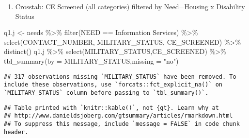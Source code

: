 \documentclass[
]{article}
\newenvironment{Shaded}{\begin{snugshade}}{\end{snugshade}}
\newcommand{\AttributeTok}[1]{\textcolor[rgb]{0.77,0.63,0.00}{#1}}
\newcommand{\FunctionTok}[1]{\textcolor[rgb]{0.00,0.00,0.00}{#1}}
\newcommand{\NormalTok}[1]{#1}
\newcommand{\OtherTok}[1]{\textcolor[rgb]{0.56,0.35,0.01}{#1}}
\newcommand{\SpecialCharTok}[1]{\textcolor[rgb]{0.00,0.00,0.00}{#1}}
\newcommand{\StringTok}[1]{\textcolor[rgb]{0.31,0.60,0.02}{#1}}
\providecommand{\tightlist}{%
  \setlength{\itemsep}{0pt}\setlength{\parskip}{0pt}}
\begin{document}
\begin{enumerate}
\def\labelenumi{\alph{enumi}.}
\setcounter{enumi}{9}
\tightlist
\item
  Crosstab: CE Screened (all categories) filtered by Need=Housing x
  Disability Status
\end{enumerate}

\begin{Shaded}
\begin{Highlighting}[]
\NormalTok{q1.j }\OtherTok{\textless{}{-}}\NormalTok{ needs }\SpecialCharTok{\%\textgreater{}\%} \FunctionTok{filter}\NormalTok{(NEED }\SpecialCharTok{==} \StringTok{\textquotesingle{}Information Services\textquotesingle{}}\NormalTok{) }\SpecialCharTok{\%\textgreater{}\%} \FunctionTok{select}\NormalTok{(CONTACT\_NUMBER, MILITARY\_STATUS, CE\_SCREENED) }\SpecialCharTok{\%\textgreater{}\%} \FunctionTok{distinct}\NormalTok{()}
\NormalTok{q1.j }\SpecialCharTok{\%\textgreater{}\%} \FunctionTok{select}\NormalTok{(MILITARY\_STATUS,CE\_SCREENED) }\SpecialCharTok{\%\textgreater{}\%} \FunctionTok{tbl\_summary}\NormalTok{(}\AttributeTok{by =}\NormalTok{ MILITARY\_STATUS,}\AttributeTok{missing =} \StringTok{"no"}\NormalTok{)}
\end{Highlighting}
\end{Shaded}

\begin{verbatim}
## 317 observations missing `MILITARY_STATUS` have been removed. To include these observations, use `forcats::fct_explicit_na()` on `MILITARY_STATUS` column before passing to `tbl_summary()`.
\end{verbatim}

\begin{verbatim}
## Table printed with `knitr::kable()`, not {gt}. Learn why at
## http://www.danieldsjoberg.com/gtsummary/articles/rmarkdown.html
## To suppress this message, include `message = FALSE` in code chunk header.
\end{verbatim}
\end{document}
